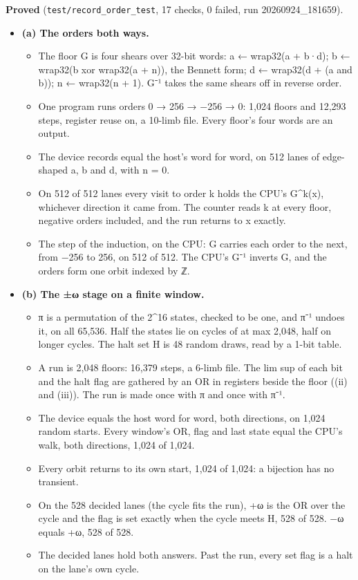 \textbf{Proved} (\texttt{test/\allowbreak{}record\_\allowbreak{}order\_\allowbreak{}test}, 17 checks, 0 failed, run 20260924\_\allowbreak{}181659).

\begin{itemize}
\item \textbf{(a) The orders both ways.}

\begin{itemize}
\item The floor G is four shears over 32-bit words: a ← wrap32(a + b·d); b ← wrap32(b xor wrap32(a + n)), the Bennett form; d ← wrap32(d + (a and b)); n ← wrap32(n + 1). G⁻¹ takes the same shears off in reverse order.
\item One program runs orders 0 → 256 → −256 → 0: 1,024 floors and 12,293 steps, register reuse on, a 10-limb file. Every floor's four words are an output.
\item The device records equal the host's word for word, on 512 lanes of edge-shaped a, b and d, with n = 0.
\item On 512 of 512 lanes every visit to order k holds the CPU's G\textasciicircum{}k(x), whichever direction it came from. The counter reads k at every floor, negative orders included, and the run returns to x exactly.
\item The step of the induction, on the CPU: G carries each order to the next, from −256 to 256, on 512 of 512. The CPU's G⁻¹ inverts G, and the orders form one orbit indexed by ℤ.
\end{itemize}
\item \textbf{(b) The ±ω stage on a finite window.}

\begin{itemize}
\item π is a permutation of the 2\textasciicircum{}16 states, checked to be one, and π⁻¹ undoes it, on all 65,536. Half the states lie on cycles of at max 2,048, half on longer cycles. The halt set H is 48 random draws, read by a 1-bit table.
\item A run is 2,048 floors: 16,379 steps, a 6-limb file. The lim sup of each bit and the halt flag are gathered by an OR in registers beside the floor ((ii) and (iii)). The run is made once with π and once with π⁻¹.
\item The device equals the host word for word, both directions, on 1,024 random starts. Every window's OR, flag and last state equal the CPU's walk, both directions, 1,024 of 1,024.
\item Every orbit returns to its own start, 1,024 of 1,024: a bijection has no transient.
\item On the 528 decided lanes (the cycle fits the run), +ω is the OR over the cycle and the flag is set exactly when the cycle meets H, 528 of 528. −ω equals +ω, 528 of 528.
\item The decided lanes hold both answers. Past the run, every set flag is a halt on the lane's own cycle.
\end{itemize}
\end{itemize}

